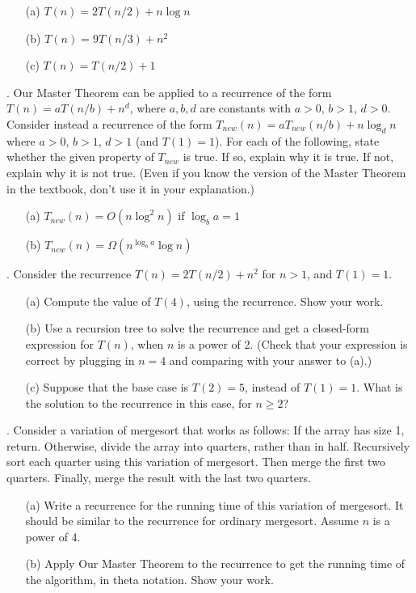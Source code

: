 \documentclass{article}
\begin{document}
\begin{enumerate}
    \item[(a)] $T(n) = 2T(n/2) + n \log n$
    \item[(b)] $T(n) = 9T(n/3) + n^2$
    \item[(c)] $T(n) = T(n/2) + 1$
\end{enumerate}

. Our Master Theorem can be applied to a recurrence of the form $T(n) = aT(n/b) + n^d$, where $a, b, d$ are constants with $a > 0$, $b > 1$, $d > 0$. Consider instead a recurrence of the form $T_{new}(n) = aT_{new}(n/b) + n \log_d n$ where $a > 0$, $b > 1$, $d > 1$ (and $T(1) = 1$). For each of the following, state whether the given property of $T_{new}$ is true. If so, explain why it is true. If not, explain why it is not true. (Even if you know the version of the Master Theorem in the textbook, don’t use it in your explanation.)

\begin{enumerate}
    \item[(a)] $T_{new}(n) = O(n \log^2 n)$ if $\log_b a = 1$
    \item[(b)] $T_{new}(n) = \Omega(n^{\log_b a} \log n)$
\end{enumerate}

. Consider the recurrence $T(n) = 2T(n/2) + n^2$ for $n > 1$, and $T(1) = 1$.

\begin{enumerate}
    \item[(a)] Compute the value of $T(4)$, using the recurrence. Show your work.
    \item[(b)] Use a recursion tree to solve the recurrence and get a closed-form expression for $T(n)$, when $n$ is a power of 2. (Check that your expression is correct by plugging in $n = 4$ and comparing with your answer to (a).)
    \item[(c)] Suppose that the base case is $T(2) = 5$, instead of $T(1) = 1$. What is the solution to the recurrence in this case, for $n \ge 2$?
\end{enumerate}

. Consider a variation of mergesort that works as follows: If the array has size 1, return. Otherwise, divide the array into quarters, rather than in half. Recursively sort each quarter using this variation of mergesort. Then merge the first two quarters. Finally, merge the result with the last two quarters.

\begin{enumerate}
    \item[(a)] Write a recurrence for the running time of this variation of mergesort. It should be similar to the recurrence for ordinary mergesort. Assume $n$ is a power of 4.
    \item[(b)] Apply Our Master Theorem to the recurrence to get the running time of the algorithm, in theta notation. Show your work.
\end{enumerate}
\end{document}

